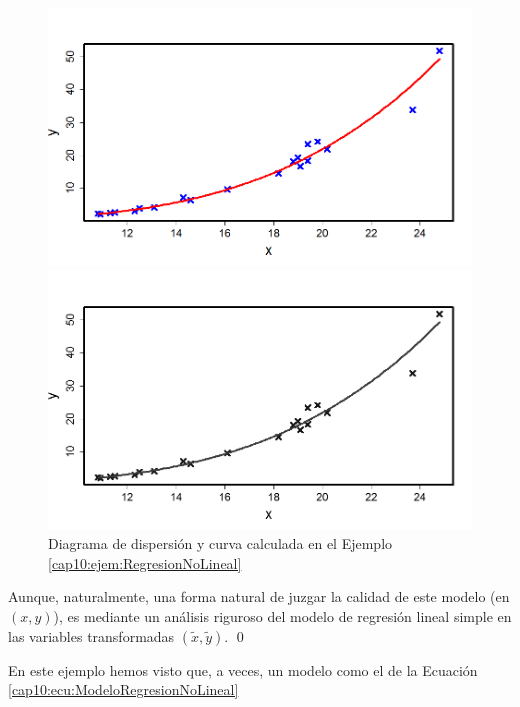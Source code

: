 \begin{ejemplo}
\begin{figure}[htb]
\begin{center}
\begin{enColor}
\includegraphics[width=14cm]{../fig/Cap10-EjemploRegresionNoLineal02.png}
\end{enColor}
\begin{bn}
\includegraphics[width=14cm]{../fig/Cap10-EjemploRegresionNoLineal02-bn.png}
\end{bn}
\end{center}
\caption{Diagrama de dispersión y curva calculada en el Ejemplo \ref{cap10:ejem:RegresionNoLineal}}
\label{cap10:fig:EjemploRegresionNoLineal02}
\end{figure}
Aunque, naturalmente, una forma natural de juzgar la calidad de este modelo (en $(x,y)$), es mediante un análisis riguroso del modelo de regresión lineal simple en las variables transformadas $(\tilde x, \tilde y)$.
\qed
\end{ejemplo}
En este ejemplo hemos visto que, a veces, un modelo como el de la Ecuación \ref{cap10:ecu:ModeloRegresionNoLineal}
